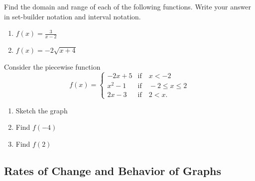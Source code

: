 \newpage

\begin{exercise}
  Find the domain and range of each of the following functions. Write your answer in set-builder notation and interval notation.
  \begin{enumerate}[twocol]
    \item $f(x)=\frac{3}{x-2}$
    \item $f(x)=-2\sqrt{x+4}$
  \end{enumerate}
\end{exercise}

\begin{exercise}
  Consider the piecewise function
  $$f(x)=\begin{cases}
    -2x+5 & \text{if}\quad x< -2\\
    x^2-1 & \text{if}\quad -2\le x\le 2\\
    2x-3 & \text{if}\quad 2< x.
  \end{cases}$$
  \begin{enumerate}[threecol]
    \item Sketch the graph
    \item Find $f(-4)$
    \item Find $f(2)$
  \end{enumerate}
\end{exercise}

\newpage

\subsection{Rates of Change and Behavior of Graphs}
